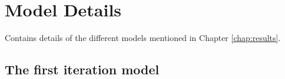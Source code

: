 \chapter{Model Details}
Contains details of the different models mentioned in Chapter \ref{chap:results}.

\section{The first iteration model}\label{sec:app2_first_iter}
\begin{comment} %
data:
  path: 'resources/datasets/'

network:
  - type: 'model-builder'
    name: 'first-iteration'
    # Data related configs:
    vocabulary_size: 20000
    user_count: 6
    max_title_length: 30
    validation_data: 'validation_data_top_5_subreddit_allvotes.csv'
    training_data: 'training_data_top_5_subreddit_allvotes.csv'
    testing_data: 'testing_data_top_5_subreddit_allvotes.csv'
    # Embedding matrix configs:
    embedding_size: 150 # Make sure to match pretrained matrix dimensions
    trainable_matrix: true
    use_pretrained: false
    pre_trained_matrix: 'vectors150d.txt'
    # Learning configs:
    learning_rate: 0.5
    training_epochs: 20
    batch_size: 25
    rnn_neurons: 200
    rnn_unit: 'lstm' # Can be 'gru' or 'lstm', default: 'lstm'
    hidden_layers: 0
    hidden_neurons: 300
    subreddit_input_neurons: 10 #Probebly not the best default value
    use_concat_input: false
    pre_train_subreddit: false
    # Regularisation configs:
    use_l2_loss: false
    l2_factor: 0.01
    use_dropout: false
    dropout_prob: 0.75
    # Validation configs:
    use_constant_limit: false
    constant_prediction_limit: 0.3
\end{comment}
